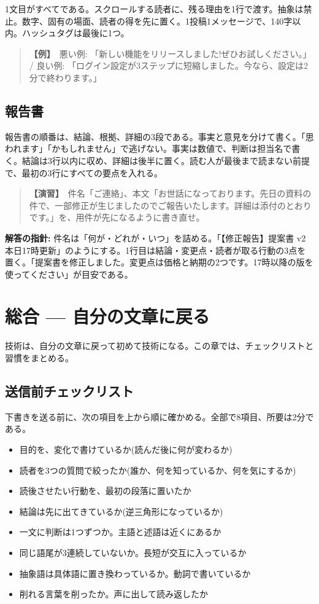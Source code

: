 \documentclass{article}
\begin{document}
1文目がすべてである。スクロールする読者に、残る理由を1行で渡す。抽象は禁止。数字、固有の場面、読者の得を先に置く。1投稿1メッセージで、140字以内。ハッシュタグは最後に1つ。

\begin{quote}
\textbf{【例】}\ 悪い例: 「新しい機能をリリースしました!ぜひお試しください。」 / 良い例: 「ログイン設定が3ステップに短縮しました。今なら、設定は2分で終わります。」
\end{quote}

\subsection{報告書}

報告書の順番は、結論、根拠、詳細の3段である。事実と意見を分けて書く。「思われます」「かもしれません」で逃げない。事実は数値で、判断は担当名で書く。結論は3行以内に収め、詳細は後半に置く。読む人が最後まで読まない前提で、最初の3行にすべての要点を入れる。

\begin{quote}
\textbf{【演習】}\ 件名「ご連絡」、本文「お世話になっております。先日の資料の件で、一部修正が生じましたのでご報告いたします。詳細は添付のとおりです。」を、用件が先になるように書き直せ。
\end{quote}

\textbf{解答の指針:} 件名は「何が・どれが・いつ」を詰める。「【修正報告】提案書 v2 本日17時更新」のようにする。1行目は結論・変更点・読者が取る行動の3点を置く。「提案書を修正しました。変更点は価格と納期の2つです。17時以降の版を使ってください」が目安である。

\section{総合 — 自分の文章に戻る}

技術は、自分の文章に戻って初めて技術になる。この章では、チェックリストと習慣をまとめる。

\subsection{送信前チェックリスト}

下書きを送る前に、次の項目を上から順に確かめる。全部で8項目、所要は2分である。

\begin{itemize}
\item 目的を、変化で書けているか(読んだ後に何が変わるか)
\item 読者を3つの質問で絞ったか(誰か、何を知っているか、何を気にするか)
\item 読後させたい行動を、最初の段落に置いたか
\item 結論は先に出てきているか(逆三角形になっているか)
\item 一文に判断は1つずつか。主語と述語は近くにあるか
\item 同じ語尾が3連続していないか。長短が交互に入っているか
\item 抽象語は具体語に置き換わっているか。動詞で書いているか
\item 削れる言葉を削ったか。声に出して読み返したか
\end{itemize}
\end{document}
